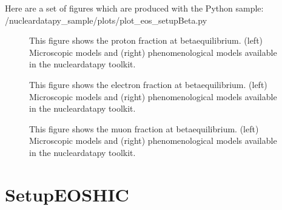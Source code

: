 \documentclass[letterpaper,10pt,english]{sphinxmanual}
\begin{document}
\sphinxAtStartPar
Here are a set of figures which are produced with the Python sample: /nucleardatapy\_sample/plots/plot\_eos\_setupBeta.py

\begin{figure}[htbp]
\centering
\capstart

\noindent{}
\caption{This figure shows the proton fraction at beta\sphinxhyphen{}equilibrium. (left) Microscopic models and (right) phenomenological models available in the nucleardatapy toolkit.}\label{\detokenize{source/api/setup_eos_beta:id1}}\end{figure}

\begin{figure}[htbp]
\centering
\capstart

\noindent{}
\caption{This figure shows the electron fraction at beta\sphinxhyphen{}equilibrium. (left) Microscopic models and (right) phenomenological models available in the nucleardatapy toolkit.}\label{\detokenize{source/api/setup_eos_beta:id2}}\end{figure}

\begin{figure}[htbp]
\centering
\capstart

\noindent{}
\caption{This figure shows the muon fraction at beta\sphinxhyphen{}equilibrium. (left) Microscopic models and (right) phenomenological models available in the nucleardatapy toolkit.}\label{\detokenize{source/api/setup_eos_beta:id3}}\end{figure}

\sphinxstepscope


\section{SetupEOSHIC}
\label{\detokenize{source/api/setup_eos_hic:setupeoshic}}\label{\detokenize{source/api/setup_eos_hic::doc}}\label{\detokenize{source/api/setup_eos_hic:module-nucleardatapy.eos.setup_hic}}
\end{document}
